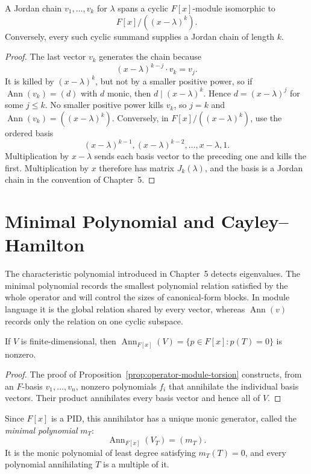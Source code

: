\begin{proposition}
\label{prop:jordan-chain-cyclic-module}
A Jordan chain \(v_1,\ldots,v_k\) for \(\lambda\) spans a cyclic
\(F[x]\)-module isomorphic to
\[
F[x]/((x-\lambda)^k).
\]
Conversely, every such cyclic summand supplies a Jordan chain of length
\(k\).
\end{proposition}
\begin{proof}
The last vector \(v_k\) generates the chain because
\[
(x-\lambda)^{k-j}\cdot v_k=v_j.
\]
It is killed by \((x-\lambda)^k\), but not by a smaller positive power,
so if \(\operatorname{Ann}(v_k)=(d)\) with \(d\) monic, then
\(d\mid(x-\lambda)^k\). Hence \(d=(x-\lambda)^j\) for some \(j\leq k\).
No smaller positive power kills \(v_k\), so \(j=k\) and
\(\operatorname{Ann}(v_k)=((x-\lambda)^k)\). Conversely, in
\(F[x]/((x-\lambda)^k)\), use the ordered basis
\[
(x-\lambda)^{k-1},(x-\lambda)^{k-2},\ldots,x-\lambda,1.
\]
Multiplication by \(x-\lambda\) sends each basis vector to the preceding
one and kills the first.  Multiplication by \(x\) therefore has matrix
\(J_k(\lambda)\), and the basis is a Jordan chain in the convention of
Chapter~5.
\end{proof}

\section{Minimal Polynomial and Cayley--Hamilton}
The characteristic polynomial introduced in Chapter~5 detects eigenvalues.
The minimal polynomial records the smallest polynomial relation satisfied by
the whole operator and will control the sizes of canonical-form blocks.  In
module language it is the global relation shared by every vector, whereas
\(\operatorname{Ann}(v)\) records only the relation on one cyclic subspace.

\begin{lemma}
If \(V\) is finite-dimensional, then
\(\operatorname{Ann}_{F[x]}(V)=\{p\in F[x]:p(T)=0\}\) is nonzero.
\end{lemma}
\begin{proof}
The proof of Proposition~\ref{prop:operator-module-torsion} constructs, from
an \(F\)-basis \(v_1,\ldots,v_n\), nonzero polynomials \(f_i\) that
annihilate the individual basis vectors.  Their product annihilates every
basis vector and hence all of \(V\).
\end{proof}

Since \(F[x]\) is a PID, this annihilator has a unique monic generator,
called the \emph{minimal polynomial} \(m_T\):
\[
\operatorname{Ann}_{F[x]}(V_T)=(m_T).
\]
It is the monic polynomial of least degree satisfying \(m_T(T)=0\), and
every polynomial annihilating \(T\) is a multiple of it.

